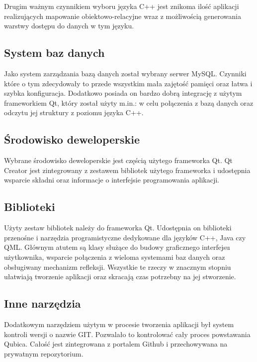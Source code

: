 \documentclass[12pt]{report}
\begin{document}
Drugim ważnym czynnikiem wyboru języka C++ jest znikoma ilość aplikacji realizujących mapowanie obiektowo-relacyjne wraz z możliwością generowania warstwy dostępu do danych w tym języku.

\subsection{System baz danych}
Jako system zarządzania bazą danych został wybrany serwer MySQL. Czynniki które o tym zdecydowały to przede wszystkim mała zajętość pamięci oraz łatwa i szybka konfiguracja. Dodatkowo posiada on bardzo dobrą integrację z użytym frameworkiem Qt, który został użyty m.in.: w celu połączenia z bazą danych oraz odczytu jej struktury z poziomu języka C++.
\subsection{Środowisko deweloperskie}
Wybrane środowisko deweloperskie jest częścią użytego frameworka Qt. Qt Creator jest zintegrowany z zestawem bibliotek użytego frameworka i udostępnia wsparcie składni oraz informacje o interfejsie programowania aplikacji.
\subsection{Biblioteki}
Użyty zestaw bibliotek należy do frameworka Qt. Udostępnia on biblioteki przenośne i narzędzia programistyczne dedykowane dla języków C++, Java czy QML. Głównym atutem są klasy służące do budowy graficznego interfejsu użytkownika, wsparcie połączenia z wieloma systemami baz danych oraz obsługiwany mechanizm refleksji. Wszystkie te rzeczy w znacznym stopniu ułatwiają tworzenie aplikacji oraz skracają czas potrzebny na jej stworzenie.
\subsection{Inne narzędzia}
Dodatkowym narzędziem użytym w procesie tworzenia aplikacji był system kontroli wersji o nazwie GIT. Pozwalało to kontrolować cały proces powstawania Qubica. Całość jest zintegrowana z portalem Github i przechowywana na prywatnym repozytorium.
\end{document}
